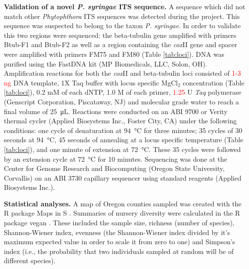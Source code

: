 \documentclass[12pt]{article}
\begin{document}


\textbf{Validation of a novel \emph{P. syringae} ITS sequence.}  A sequence which did not match other \emph{Phytophthora} ITS sequences was detected during the project.  This sequence was suspected to belong to the taxon \emph{P. syringae}.  In order to validate this two regions were sequenced: the beta-tubulin gene amplified with primers Btub-F1 and Btub-F2 as well as a region containing the \emph{cox}II gene and spacer were amplified with primers FM75 and FM80 (Table \ref{tab:loci}).  DNA was purified using the FastDNA kit (MP Biomedicals, LLC, Solon, OH).  Amplification reactions for both  the \emph{cox}II and beta-tubulin loci consisted of \textcolor{red}{1-3 ng} DNA template, 1X Taq buffer with locus specific MgCl$_{2}$ concentration (Table \ref{tab:loci}), 0.2 mM of each dNTP, 1.0 \textmu M of each primer, \textcolor{red}{1.25} U \emph{Taq} polymerase (Genscript Corporation, Piscataway, NJ) and molecular grade water to reach a final volume of \SI{25}{\micro\liter}.  Reactions were conducted on an ABI 9700 or Verity thermal cycler (Applied Biosystems Inc., Foster City, CA) under the following conditions: one cycle of denaturation at \SI{94}{\celsius} for three minutes; 35 cycles of 30 seconds at \SI{94}{\celsius}, 45 seconds of annealing at a locus specific temperature (Table \ref{tab:loci}), and one minute of extension at \SI{72}{\celsius}.  These 35 cycles were followed by an extension cycle at \SI{72}{\celsius} for 10 minutes.  Sequencing was done at the Center for Genome Research and Biocomputing (Oregon State University, Corvallis) on an ABI 3730 capillary sequencer using standard reagents (Applied Biosystems Inc.).




\textbf{Statistical analyses.} A map of Oregon counties sampled was created with the R package Maps in S \cite{R, r_maps}.  Summaries of nursery diversity were calculated in the R package vegan \cite{R, vegan}.  These included the sample size, richness (number of species), Shannon-Wiener index, evenness (the Shannon-Wiener index divided by it's maximum expected value in order to scale it from zero to one) and Simpson's index (i.e., the probability that two individuals sampled at random will be of different species).
\end{document}
